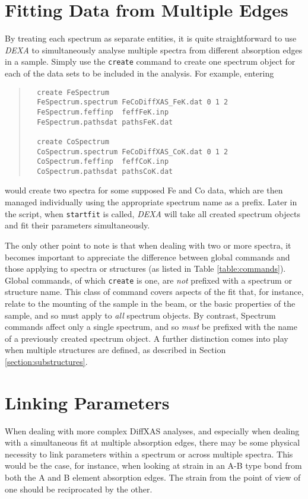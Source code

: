 \documentclass[a4paper,12pt]{report}
\newcommand{\dexa}{\emph{DEXA} }
\begin{document}
\section{Fitting Data from Multiple Edges}
\label{section:multiple}
By treating each spectrum as separate entities, it is quite straightforward to use \dexa to simultaneously analyse multiple spectra from different absorption edges in a sample. Simply use the \verb|create| command to create one spectrum object for each of the data sets to be included in the analysis. For example, entering
\begin{quote}
  \begin{verbatim}
  create FeSpectrum
  FeSpectrum.spectrum FeCoDiffXAS_FeK.dat 0 1 2
  FeSpectrum.feffinp  feffFeK.inp
  FeSpectrum.pathsdat pathsFeK.dat

  create CoSpectrum  
  CoSpectrum.spectrum FeCoDiffXAS_CoK.dat 0 1 2
  CoSpectrum.feffinp  feffCoK.inp
  CoSpectrum.pathsdat pathsCoK.dat
  \end{verbatim}
\end{quote}
would create two spectra for some supposed Fe and Co data, which are then managed individually using the appropriate spectrum name as a prefix. Later in the script, when \verb|startfit| is called, \dexa will take all created spectrum objects and fit their parameters simultaneously.

The only other point to note is that when dealing with two or more spectra, it becomes important to appreciate the difference between global commands and those applying to spectra or structures (as listed in Table \ref{table:commands}). Global commands, of which \verb|create| is one, are \emph{not} prefixed with a spectrum or structure name. This class of command covers aspects of the fit that, for instance, relate to the mounting of the sample in the beam, or the basic properties of the sample, and so must apply to \emph{all} spectrum objects. By contrast, Spectrum commands affect only a single spectrum, and so \emph{must} be prefixed with the name of a previously created spectrum object. A further distinction comes into play when multiple structures are defined, as described in Section \ref{section:substructures}.




\section{Linking Parameters}
\label{section:linking}
When dealing with more complex DiffXAS analyses, and especially when dealing with a simultaneous fit at multiple absorption edges, there may be some physical necessity to link parameters within a spectrum or across multiple spectra. This would be the case, for instance, when looking at strain in an A-B type bond from both the A and B element absorption edges. The strain from the point of view of one should be reciprocated by the other.
\end{document}
